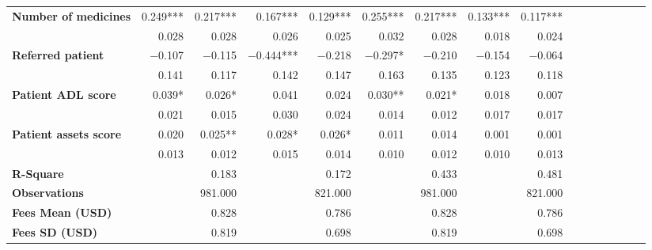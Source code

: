 \begin{tabular}{@{\extracolsep{5pt}}lrrrrrrrrrrrrrrr}
{\bf Number of medicines} & 0.249*** & 0.217*** & 0.167*** & 0.129*** & 0.255*** & 0.217*** & 0.133*** & 0.117*** \\
{\bf } & 0.028\phantom{***} & 0.028\phantom{***} & 0.026\phantom{***} & 0.025\phantom{***} & 0.032\phantom{***} & 0.028\phantom{***} & 0.018\phantom{***} & 0.024\phantom{***} \\
{\bf Referred patient} & $-$0.107\phantom{***} & $-$0.115\phantom{***} & $-$0.444*** & $-$0.218\phantom{***} & $-$0.297*\phantom{**} & $-$0.210\phantom{***} & $-$0.154\phantom{***} & $-$0.064\phantom{***} \\
{\bf } & 0.141\phantom{***} & 0.117\phantom{***} & 0.142\phantom{***} & 0.147\phantom{***} & 0.163\phantom{***} & 0.135\phantom{***} & 0.123\phantom{***} & 0.118\phantom{***} \\
{\bf Patient ADL score} & 0.039*\phantom{**} & 0.026*\phantom{**} & 0.041\phantom{***} & 0.024\phantom{***} & 0.030**\phantom{*} & 0.021*\phantom{**} & 0.018\phantom{***} & 0.007\phantom{***} \\
{\bf } & 0.021\phantom{***} & 0.015\phantom{***} & 0.030\phantom{***} & 0.024\phantom{***} & 0.014\phantom{***} & 0.012\phantom{***} & 0.017\phantom{***} & 0.017\phantom{***} \\
{\bf Patient assets score} & 0.020\phantom{***} & 0.025**\phantom{*} & 0.028*\phantom{**} & 0.026*\phantom{**} & 0.011\phantom{***} & 0.014\phantom{***} & 0.001\phantom{***} & 0.001\phantom{***} \\
{\bf } & 0.013\phantom{***} & 0.012\phantom{***} & 0.015\phantom{***} & 0.014\phantom{***} & 0.010\phantom{***} & 0.012\phantom{***} & 0.010\phantom{***} & 0.013\phantom{***} \\
{\bf R-Square} & \phantom{***} & 0.183\phantom{***} & \phantom{***} & 0.172\phantom{***} & \phantom{***} & 0.433\phantom{***} & \phantom{***} & 0.481\phantom{***} \\
{\bf Observations} & \phantom{***} & 981.000\phantom{***} & \phantom{***} & 821.000\phantom{***} & \phantom{***} & 981.000\phantom{***} & \phantom{***} & 821.000\phantom{***} \\
{\bf Fees Mean (USD)} & \phantom{***} & 0.828\phantom{***} & \phantom{***} & 0.786\phantom{***} & \phantom{***} & 0.828\phantom{***} & \phantom{***} & 0.786\phantom{***} \\
{\bf Fees SD (USD)} & \phantom{***} & 0.819\phantom{***} & \phantom{***} & 0.698\phantom{***} & \phantom{***} & 0.819\phantom{***} & \phantom{***} & 0.698\phantom{***} \\
\hline
\end{tabular}
